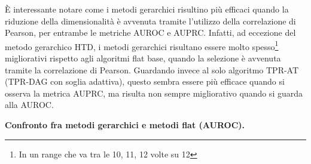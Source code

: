 \documentclass[12pt]{report}
\begin{document}
\newline
\newline
È interessante notare come i metodi gerarchici risultino più efficaci quando la riduzione della dimensionalità è avvenuta tramite l'utilizzo della correlazione di Pearson, per entrambe le metriche AUROC e AUPRC. Infatti, ad eccezione del metodo gerarchico HTD, i metodi gerarchici risultano essere molto spesso\footnote{\footnotesize{In un range che va tra le 10, 11, 12 volte su 12}} migliorativi rispetto agli algoritmi flat base, quando la selezione è avvenuta tramite la correlazione di Pearson. Guardando invece al solo algoritmo TPR-AT (TPR-DAG con soglia adattiva), questo sembra essere più efficace quando si osserva la metrica AUPRC, ma risulta non sempre migliorativo quando si guarda alla AUROC.

\begin{table}[h!]
\hspace*{0.6in}
\caption*{\textbf{Confronto fra metodi gerarchici e metodi flat (AUROC).}}

\hspace*{0.6in}
\hspace*{0.6in}
\end{table}
\end{document}
